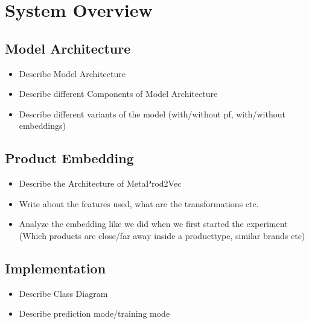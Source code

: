 \chapter{System Overview}

\section{Model Architecture}
\begin{itemize}
\item Describe Model Architecture
\item Describe different Components of Model Architecture
\item Describe different variants of the model (with/without pf, with/without embeddings)
\end{itemize}

\section{Product Embedding}
\begin{itemize}
    \item Describe the Architecture of MetaProd2Vec
    \item Write about the features used, what are the transformations etc.
    \item Analyze the embedding like we did when we first started the experiment (Which products are close/far away inside a producttype, similar brands etc)
\end{itemize}

\section{Implementation}
\begin{itemize}
\item Describe Class Diagram
\item Describe prediction mode/training mode
\end{itemize}

